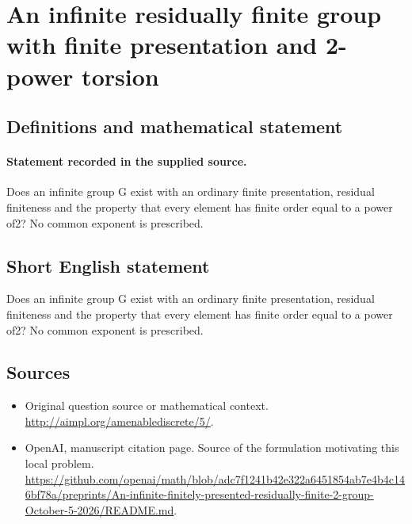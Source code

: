\documentclass[11pt]{article}
\begin{document}
\section*{An infinite residually finite group with finite presentation and 2-power torsion}\label{statement}
\subsection{Definitions and mathematical statement}
\paragraph{Statement recorded in the supplied source.}
Does an infinite group G exist with an ordinary finite presentation, residual finiteness and the property that every element has finite order equal to a power of2? No common exponent is prescribed.
\subsection{Short English statement}
Does an infinite group G exist with an ordinary finite presentation, residual finiteness and the property that every element has finite order equal to a power of2? No common exponent is prescribed.
\subsection{Sources}
\begin{itemize}
\item[S1] Original question source or mathematical context.
\url{http://aimpl.org/amenablediscrete/5/}.
\item[S2] OpenAI, manuscript citation page. Source of the formulation motivating this local problem.
\url{https://github.com/openai/math/blob/adc7f1241b42e322a6451854ab7e4b4c146bf78a/preprints/An-infinite-finitely-presented-residually-finite-2-group-October-5-2026/README.md}.
\end{itemize}
\end{document}
